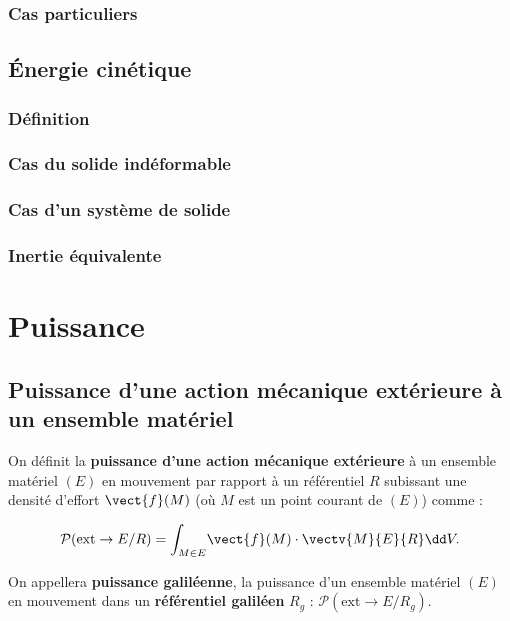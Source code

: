 \subsubsection{Cas particuliers}

\subsection{Énergie cinétique}
\subsubsection{Définition}
\subsubsection{Cas du solide indéformable}
\subsubsection{Cas d'un système de solide}
\subsubsection{Inertie équivalente}
\section{Puissance}
\subsection{Puissance d'une action mécanique extérieure à un ensemble matériel}
\begin{defi}%
On définit la \textbf{puissance d'une action mécanique extérieure} à un ensemble matériel $(E)$ en mouvement par rapport à un référentiel $R$ subissant une densité d'effort $\vect{f}(M)$ (où $M$ est un point courant de $(E)$) comme :

$$
\mathcal{P}(\text{ext} \rightarrow E/R)=\displaystyle{\int_{M\in E}}\vect{f}(M)\cdot \vectv{M}{E}{R}%
\dd V.
$$
\end{defi}

\begin{rem}%
On appellera \textbf{puissance galiléenne}, la puissance d'un ensemble matériel $(E)$ en mouvement dans un \textbf{référentiel galiléen} $R_g$ : 
$
\mathcal{P}(\text{ext} \rightarrow E/R_g)
$.
\end{rem}%


